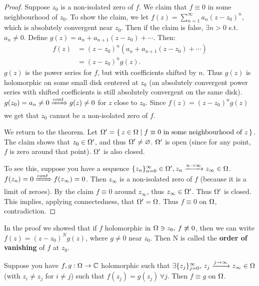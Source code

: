 \begin{proof}
Suppose $z_0$ is a non-isolated zero of $f$. We claim that $f\equiv 0$ in some neighbourhood of $z_0$. To show the claim, we let $f(z) = \sum_{n=1}^{\infty} a_n (z-z_0)^n$, which is absolutely convergent near $z_0$. Then if the claim is false, $\exists n >0$ s.t. $a_n\neq 0$. Define $g(z) = a_n+a_{n+1}(z-z_0) + \cdots $. Then:
\begin{align*}
    f(z) &= (z-z_0)^n(a_n+a_{n+1}(z-z_0) + \cdots )\\
    &= (z-z_0)^ng(z).
\end{align*}
$g(z)$ is the power series for $f$, but with coefficients shifted by $n$. Thus $g(z)$ is holomorphic on some small disk centered at $z_0$ (an absolutely convergent power series with shifted coefficients is still absolutely convergent on the same disk). $g(z_0) = a_n \neq 0 \xRightarrow[]{cont} g(z) \neq 0$ for $z$ close to $z_0$. Since $f(z) = (z-z_0)^ng(z)$ we get that $z_0$ cannot be a non-isolated zero of $f$.

We return to the theorem. Let $\Omega ' = \set{ z \in \Omega| f \equiv 0 \text{ in some neighbourhood of } z }$. The claim shows that $z_0 \in \Omega '$, and thus $\Omega ' \neq \varnothing$. $\Omega '$ is open (since for any point, $f$ is zero around that point). $\Omega '$ is also closed.

To see this, suppose you have a sequence $\{ z_n \}_{n=0}^\infty \in \Omega ', z_n \xrightarrow[]{n\to \infty} z_\infty \in \Omega $. $f(z_n) = 0 \xRightarrow[]{cont} f(z_\infty) = 0$. Then $z_\infty$ is a non-isolated zero of $f$ (because it is a limit of zeroes). By the claim $f \equiv 0 $ around $z_\infty$, thus $z_\infty \in \Omega '$. Thus $\Omega '$ is closed. This implies, applying connectedness, that $\Omega ' = \Omega$. Thus $f \equiv 0$ on $\Omega$, contradiction.

\end{proof} 


\begin{definition}\label{def:order-vanish}
In the proof we showed that if $f$ holomorphic in $\Omega \ni z_0, \: f \not\equiv 0$, then we can write $f(z) = (z-z_0)^N g(z)$, where $g \neq 0$ near $z_0$. Then N is called the \textbf{order of vanishing} of $f$ at $z_0$.



\end{definition}


\begin{corollary}\label{cor:ident-princ}
Suppose you have $f,g: \Omega \to \mathbb{C}$ holomorphic such that $\exists \{ z_j \}_{j=0}^\infty, \, z_j \xrightarrow[]{j \to \infty} z_\infty \in \Omega$ (with $z_i \neq z_j$ for $i \neq j$) such that $f(z_j) = g(z_j) \, \forall j$. Then $f \equiv g$ on $\Omega$.
\end{corollary}

